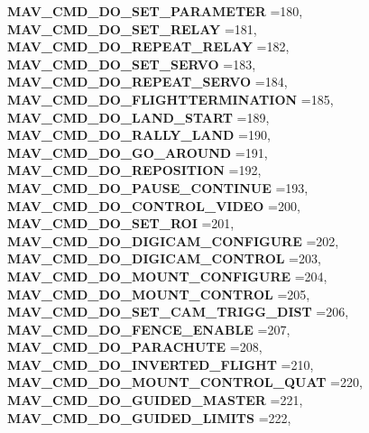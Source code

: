 \begin{DoxyCompactItemize}
\textbf{ M\+A\+V\+\_\+\+C\+M\+D\+\_\+\+D\+O\+\_\+\+S\+E\+T\+\_\+\+P\+A\+R\+A\+M\+E\+T\+ER} =180, 
\textbf{ M\+A\+V\+\_\+\+C\+M\+D\+\_\+\+D\+O\+\_\+\+S\+E\+T\+\_\+\+R\+E\+L\+AY} =181, 
\newline
\textbf{ M\+A\+V\+\_\+\+C\+M\+D\+\_\+\+D\+O\+\_\+\+R\+E\+P\+E\+A\+T\+\_\+\+R\+E\+L\+AY} =182, 
\textbf{ M\+A\+V\+\_\+\+C\+M\+D\+\_\+\+D\+O\+\_\+\+S\+E\+T\+\_\+\+S\+E\+R\+VO} =183, 
\textbf{ M\+A\+V\+\_\+\+C\+M\+D\+\_\+\+D\+O\+\_\+\+R\+E\+P\+E\+A\+T\+\_\+\+S\+E\+R\+VO} =184, 
\textbf{ M\+A\+V\+\_\+\+C\+M\+D\+\_\+\+D\+O\+\_\+\+F\+L\+I\+G\+H\+T\+T\+E\+R\+M\+I\+N\+A\+T\+I\+ON} =185, 
\newline
\textbf{ M\+A\+V\+\_\+\+C\+M\+D\+\_\+\+D\+O\+\_\+\+L\+A\+N\+D\+\_\+\+S\+T\+A\+RT} =189, 
\textbf{ M\+A\+V\+\_\+\+C\+M\+D\+\_\+\+D\+O\+\_\+\+R\+A\+L\+L\+Y\+\_\+\+L\+A\+ND} =190, 
\textbf{ M\+A\+V\+\_\+\+C\+M\+D\+\_\+\+D\+O\+\_\+\+G\+O\+\_\+\+A\+R\+O\+U\+ND} =191, 
\textbf{ M\+A\+V\+\_\+\+C\+M\+D\+\_\+\+D\+O\+\_\+\+R\+E\+P\+O\+S\+I\+T\+I\+ON} =192, 
\newline
\textbf{ M\+A\+V\+\_\+\+C\+M\+D\+\_\+\+D\+O\+\_\+\+P\+A\+U\+S\+E\+\_\+\+C\+O\+N\+T\+I\+N\+UE} =193, 
\textbf{ M\+A\+V\+\_\+\+C\+M\+D\+\_\+\+D\+O\+\_\+\+C\+O\+N\+T\+R\+O\+L\+\_\+\+V\+I\+D\+EO} =200, 
\textbf{ M\+A\+V\+\_\+\+C\+M\+D\+\_\+\+D\+O\+\_\+\+S\+E\+T\+\_\+\+R\+OI} =201, 
\textbf{ M\+A\+V\+\_\+\+C\+M\+D\+\_\+\+D\+O\+\_\+\+D\+I\+G\+I\+C\+A\+M\+\_\+\+C\+O\+N\+F\+I\+G\+U\+RE} =202, 
\newline
\textbf{ M\+A\+V\+\_\+\+C\+M\+D\+\_\+\+D\+O\+\_\+\+D\+I\+G\+I\+C\+A\+M\+\_\+\+C\+O\+N\+T\+R\+OL} =203, 
\textbf{ M\+A\+V\+\_\+\+C\+M\+D\+\_\+\+D\+O\+\_\+\+M\+O\+U\+N\+T\+\_\+\+C\+O\+N\+F\+I\+G\+U\+RE} =204, 
\textbf{ M\+A\+V\+\_\+\+C\+M\+D\+\_\+\+D\+O\+\_\+\+M\+O\+U\+N\+T\+\_\+\+C\+O\+N\+T\+R\+OL} =205, 
\textbf{ M\+A\+V\+\_\+\+C\+M\+D\+\_\+\+D\+O\+\_\+\+S\+E\+T\+\_\+\+C\+A\+M\+\_\+\+T\+R\+I\+G\+G\+\_\+\+D\+I\+ST} =206, 
\newline
\textbf{ M\+A\+V\+\_\+\+C\+M\+D\+\_\+\+D\+O\+\_\+\+F\+E\+N\+C\+E\+\_\+\+E\+N\+A\+B\+LE} =207, 
\textbf{ M\+A\+V\+\_\+\+C\+M\+D\+\_\+\+D\+O\+\_\+\+P\+A\+R\+A\+C\+H\+U\+TE} =208, 
\textbf{ M\+A\+V\+\_\+\+C\+M\+D\+\_\+\+D\+O\+\_\+\+I\+N\+V\+E\+R\+T\+E\+D\+\_\+\+F\+L\+I\+G\+HT} =210, 
\textbf{ M\+A\+V\+\_\+\+C\+M\+D\+\_\+\+D\+O\+\_\+\+M\+O\+U\+N\+T\+\_\+\+C\+O\+N\+T\+R\+O\+L\+\_\+\+Q\+U\+AT} =220, 
\newline
\textbf{ M\+A\+V\+\_\+\+C\+M\+D\+\_\+\+D\+O\+\_\+\+G\+U\+I\+D\+E\+D\+\_\+\+M\+A\+S\+T\+ER} =221, 
\textbf{ M\+A\+V\+\_\+\+C\+M\+D\+\_\+\+D\+O\+\_\+\+G\+U\+I\+D\+E\+D\+\_\+\+L\+I\+M\+I\+TS} =222, 

\end{DoxyCompactItemize}
